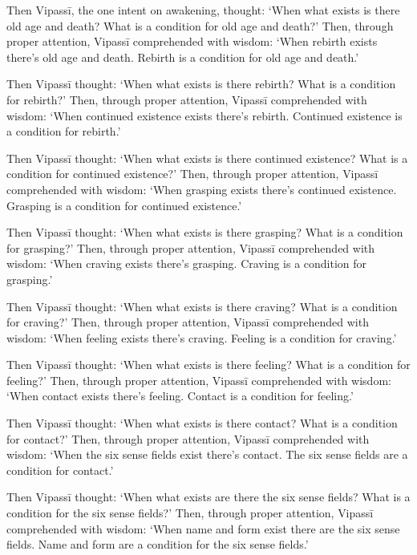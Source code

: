 \documentclass[12pt,openany]{book}%
\begin{document}
Then \textsanskrit{Vipassī}, the one intent on awakening, thought: ‘When what exists is there old age and death? What is a condition for old age and death?’ Then, through proper attention, \textsanskrit{Vipassī} comprehended with wisdom: ‘When rebirth exists there’s old age and death. Rebirth is a condition for old age and death.’ 

Then \textsanskrit{Vipassī} thought: ‘When what exists is there rebirth? What is a condition for rebirth?’ Then, through proper attention, \textsanskrit{Vipassī} comprehended with wisdom: ‘When continued existence exists there’s rebirth. Continued existence is a condition for rebirth.’ 

Then \textsanskrit{Vipassī} thought: ‘When what exists is there continued existence? What is a condition for continued existence?’ Then, through proper attention, \textsanskrit{Vipassī} comprehended with wisdom: ‘When grasping exists there’s continued existence. Grasping is a condition for continued existence.’ 

Then \textsanskrit{Vipassī} thought: ‘When what exists is there grasping? What is a condition for grasping?’ Then, through proper attention, \textsanskrit{Vipassī} comprehended with wisdom: ‘When craving exists there’s grasping. Craving is a condition for grasping.’ 

Then \textsanskrit{Vipassī} thought: ‘When what exists is there craving? What is a condition for craving?’ Then, through proper attention, \textsanskrit{Vipassī} comprehended with wisdom: ‘When feeling exists there’s craving. Feeling is a condition for craving.’ 

Then \textsanskrit{Vipassī} thought: ‘When what exists is there feeling? What is a condition for feeling?’ Then, through proper attention, \textsanskrit{Vipassī} comprehended with wisdom: ‘When contact exists there’s feeling. Contact is a condition for feeling.’ 

Then \textsanskrit{Vipassī} thought: ‘When what exists is there contact? What is a condition for contact?’ Then, through proper attention, \textsanskrit{Vipassī} comprehended with wisdom: ‘When the six sense fields exist there’s contact. The six sense fields are a condition for contact.’ 

Then \textsanskrit{Vipassī} thought: ‘When what exists are there the six sense fields? What is a condition for the six sense fields?’ Then, through proper attention, \textsanskrit{Vipassī} comprehended with wisdom: ‘When name and form exist there are the six sense fields. Name and form are a condition for the six sense fields.’ 
\end{document}
